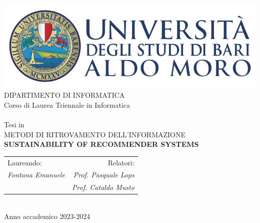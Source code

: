 

\begin{titlepage}
    \begin{center}
        \includegraphics[scale=0.5]{images/uniba-logo.png}\\
        \vspace{1cm}
        {\large DIPARTIMENTO DI INFORMATICA}\\
        \vspace{1cm}
        {\large Corso di Laurea Triennale in Informatica}\\
        \hrulefill \\
        \vspace{1cm}
        {\large Tesi in}\\
        \vspace{0.5cm}
        {\large METODI DI RITROVAMENTO DELL'INFORMAZIONE}\\
        \vspace{1cm}
        {\LARGE \textbf{SUSTAINABILITY OF RECOMMENDER SYSTEMS}}
        \\ %
        \vspace{1cm}

        \vfill
        \centering
        \begin{tabularx}{\textwidth}{@{}Xr@{}}
          {\large Laureando:} & {\large Relatori:} \\ 
          {\large \textit{Fontana Emanuele}} & {\large \textit{Prof. Pasquale Lops}} \\ 
          {} & {\large \textit{Prof. Cataldo Musto}} \\ 
        \end{tabularx}
        \vspace{2cm}
        \hrulefill \\
        {\large Anno accademico 2023-2024}
    \end{center}
\end{titlepage}